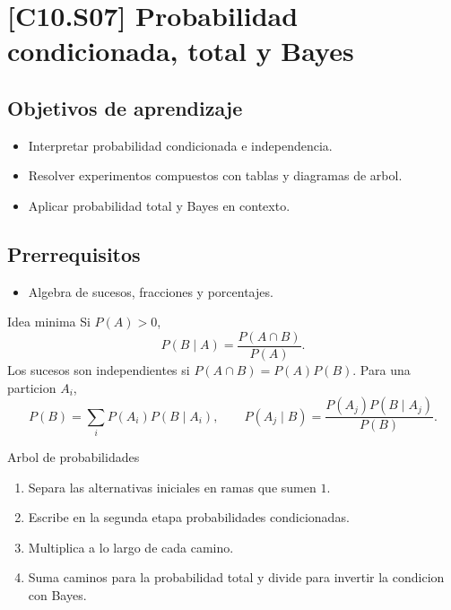 \section{[C10.S07] Probabilidad condicionada, total y Bayes}

\subsection*{Objetivos de aprendizaje}
\begin{itemize}
  \item Interpretar probabilidad condicionada e independencia.
  \item Resolver experimentos compuestos con tablas y diagramas de arbol.
  \item Aplicar probabilidad total y Bayes en contexto.
\end{itemize}

\subsection*{Prerrequisitos}
\begin{itemize}
  \item Algebra de sucesos, fracciones y porcentajes.
\end{itemize}

\begin{theorybox}{Idea minima}
Si \(P(A)>0\),
\[
P(B\mid A)=\frac{P(A\cap B)}{P(A)}.
\]
Los sucesos son independientes si \(P(A\cap B)=P(A)P(B)\). Para una particion \(A_i\),
\[
P(B)=\sum_i P(A_i)P(B\mid A_i),
\qquad
P(A_j\mid B)=\frac{P(A_j)P(B\mid A_j)}{P(B)}.
\]
\end{theorybox}

\begin{methodbox}{Arbol de probabilidades}
\begin{enumerate}
  \item Separa las alternativas iniciales en ramas que sumen \(1\).
  \item Escribe en la segunda etapa probabilidades condicionadas.
  \item Multiplica a lo largo de cada camino.
  \item Suma caminos para la probabilidad total y divide para invertir la condicion con Bayes.
\end{enumerate}
\end{methodbox}

